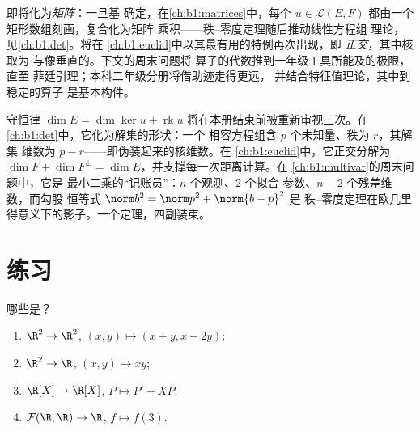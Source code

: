 \begin{remark}[这些映射的用途]
\label{rem:b1:linmaps:whereused}
即将化为\emph{矩阵}：一旦基
确定，在\cref{ch:b1:matrices}中，每个 $u \in \mathcal{L}(E,
F)$ 都由一个矩形数组刻画，复合化为矩阵
乘积——秩–零度定理随后推动线性方程组
理论，见\cref{ch:b1:det}。将在
\cref{ch:b1:euclid}中以其最有用的特例再次出现，即
\emph{正交}，其中核取为
与像垂直的。下文的周末问题将
算子的代数推到一年级工具所能及的极限，直至
菲廷引理；本科二年级分册将借助迹走得更远，
并结合特征值理论，其中到稳定的算子
是基本构件。
\end{remark}

\begin{remark}
\label{rem:b1:linmaps:perspectives}
守恒律 $\dim E = \dim\ker u + \operatorname{rk} u$
将在本册结束前被重新审视三次。在
\cref{ch:b1:det}中，它化为解集的形状：一个
相容方程组含 $p$ 个未知量、秩为 $r$，其解集
维数为 $p - r$——即伪装起来的核维数。在
\cref{ch:b1:euclid}中，它正交分解为 $\dim F + \dim
F^\perp = \dim E$，并支撑每一次距离计算。在
\cref{ch:b1:multivar}的周末问题中，它是
最小二乘的“记账员”：$n$ 个观测、$2$ 个拟合
参数、$n - 2$ 个残差维数，而勾股
恒等式 $\norm b^2 = \norm p^2 + \norm{b - p}^2$ 是
秩–零度定理在欧几里得意义下的影子。一个定理，四副装束。
\end{remark}

\section{练习}

\begin{exercise}[$\star$]\label{exo:b1:linmaps:1}
哪些是？
\begin{enumerate}
  \item $\R^2 \to \R^2$, $(x, y) \mapsto (x + y, x - 2y)$;
  \item $\R^2 \to \R$, $(x, y) \mapsto xy$;
  \item $\R[X] \to \R[X]$, $P \mapsto P' + XP$;
  \item $\mathcal{F}(\R,\R) \to \R$, $f \mapsto f(3)$.
\end{enumerate}
\end{exercise}

